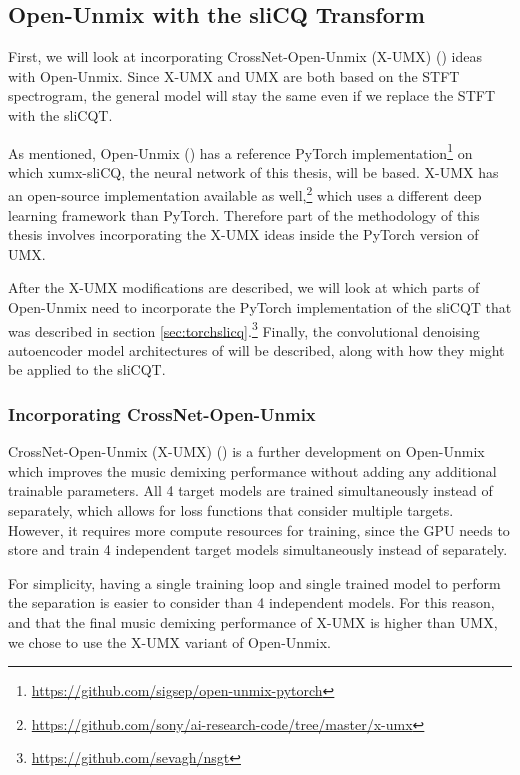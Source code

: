 \documentclass[report.tex]{subfiles}
\begin{document}
\newpagefill

\subsection{Open-Unmix with the sliCQ Transform}
\label{sec:slicqumx}

First, we will look at incorporating CrossNet-Open-Unmix (X-UMX) (\cite{xumx}) ideas with Open-Unmix. Since X-UMX and UMX are both based on the STFT spectrogram, the general model will stay the same even if we replace the STFT with the sliCQT.

As mentioned, Open-Unmix (\cite{umx}) has a reference PyTorch implementation\footnote{\url{https://github.com/sigsep/open-unmix-pytorch}} on which xumx-sliCQ, the neural network of this thesis, will be based. X-UMX has an open-source implementation available as well,\footnote{\url{https://github.com/sony/ai-research-code/tree/master/x-umx}} which uses a different deep learning framework than PyTorch. Therefore part of the methodology of this thesis involves incorporating the X-UMX ideas inside the PyTorch version of UMX.

After the X-UMX modifications are described, we will look at which parts of Open-Unmix need to incorporate the PyTorch implementation of the sliCQT that was described in section \ref{sec:torchslicq}.\footnote{\url{https://github.com/sevagh/nsgt}} Finally, the convolutional denoising autoencoder model architectures of \textcite{plumbley1, plumbley2}  will be described, along with how they might be applied to the sliCQT.

\subsubsection{Incorporating CrossNet-Open-Unmix}

CrossNet-Open-Unmix (X-UMX) (\cite{xumx}) is a further development on Open-Unmix which improves the music demixing performance without adding any additional trainable parameters. All 4 target models are trained simultaneously instead of separately, which allows for loss functions that consider multiple targets. However, it requires more compute resources for training, since the GPU needs to store and train 4 independent target models simultaneously instead of separately.

For simplicity, having a single training loop and single trained model to perform the separation is easier to consider than 4 independent models. For this reason, and that the final music demixing performance of X-UMX is higher than UMX, we chose to use the X-UMX variant of Open-Unmix.
\end{document}
